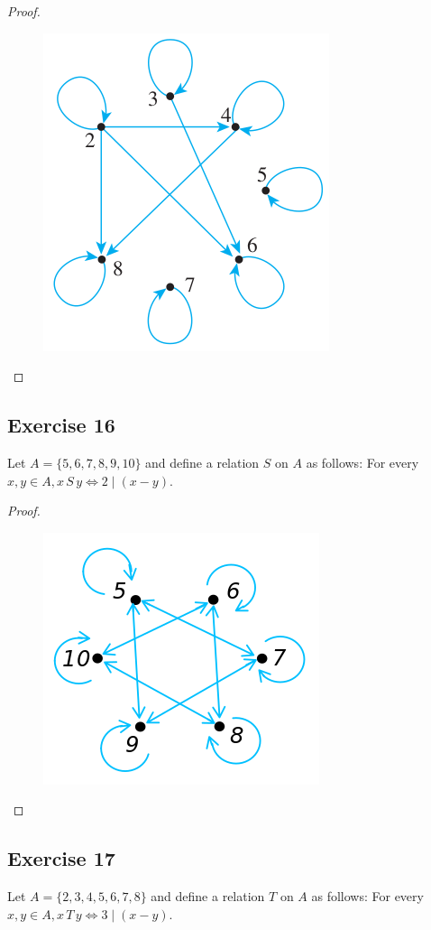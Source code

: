 \documentclass[14pt]{extarticle}
\begin{document}
\begin{proof}
\begin{figure}[ht!]
\centering
\includegraphics[scale=0.4]{../images/8.1.15.png}
\end{figure}
\end{proof}

\subsection{Exercise 16}
Let \(A = \{5, 6, 7, 8, 9, 10\}\) and define a relation $S$ on $A$ as follows: For every \(x, y \in A, x \, S \, y \iff 
2 \mid (x - y)\).

\begin{proof}
\begin{figure}[ht!]
\centering
\includegraphics[scale=0.4]{../images/8.1.16.png}
\end{figure}
\end{proof}

\subsection{Exercise 17}
Let \(A = \{2, 3, 4, 5, 6, 7, 8\}\) and define a relation $T$ on $A$ as follows: For every \(x, y \in A, x \, T \, y 
\iff 3 \mid (x - y)\).
\end{document}
